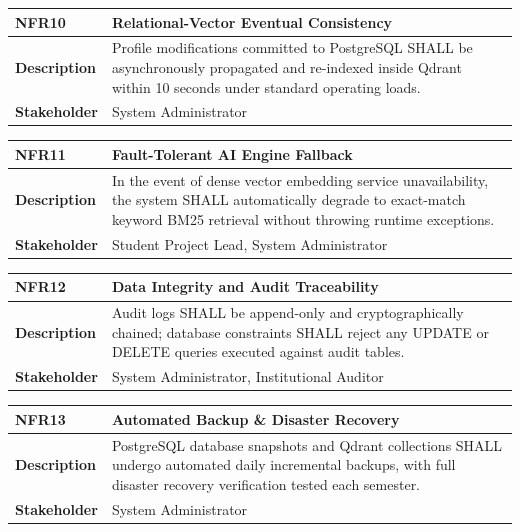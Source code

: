 \begin{table}[H]
\centering
\small
\begin{tabularx}{\textwidth}{|l|X|}
\hline
\rowcolor{lightgray!40} \textbf{NFR10} & \textbf{Relational-Vector Eventual Consistency} \\ \hline
\textbf{Description} & Profile modifications committed to PostgreSQL SHALL be asynchronously propagated and re-indexed inside Qdrant within 10 seconds under standard operating loads. \\ \hline
\textbf{Stakeholder} & System Administrator \\ \hline
\end{tabularx}
\end{table}

\begin{table}[H]
\centering
\small
\begin{tabularx}{\textwidth}{|l|X|}
\hline
\rowcolor{lightgray!40} \textbf{NFR11} & \textbf{Fault-Tolerant AI Engine Fallback} \\ \hline
\textbf{Description} & In the event of dense vector embedding service unavailability, the system SHALL automatically degrade to exact-match keyword BM25 retrieval without throwing runtime exceptions. \\ \hline
\textbf{Stakeholder} & Student Project Lead, System Administrator \\ \hline
\end{tabularx}
\end{table}

\begin{table}[H]
\centering
\small
\begin{tabularx}{\textwidth}{|l|X|}
\hline
\rowcolor{lightgray!40} \textbf{NFR12} & \textbf{Data Integrity and Audit Traceability} \\ \hline
\textbf{Description} & Audit logs SHALL be append-only and cryptographically chained; database constraints SHALL reject any UPDATE or DELETE queries executed against audit tables. \\ \hline
\textbf{Stakeholder} & System Administrator, Institutional Auditor \\ \hline
\end{tabularx}
\end{table}

\begin{table}[H]
\centering
\small
\begin{tabularx}{\textwidth}{|l|X|}
\hline
\rowcolor{lightgray!40} \textbf{NFR13} & \textbf{Automated Backup \& Disaster Recovery} \\ \hline
\textbf{Description} & PostgreSQL database snapshots and Qdrant collections SHALL undergo automated daily incremental backups, with full disaster recovery verification tested each semester. \\ \hline
\textbf{Stakeholder} & System Administrator \\ \hline
\end{tabularx}
\end{table}

